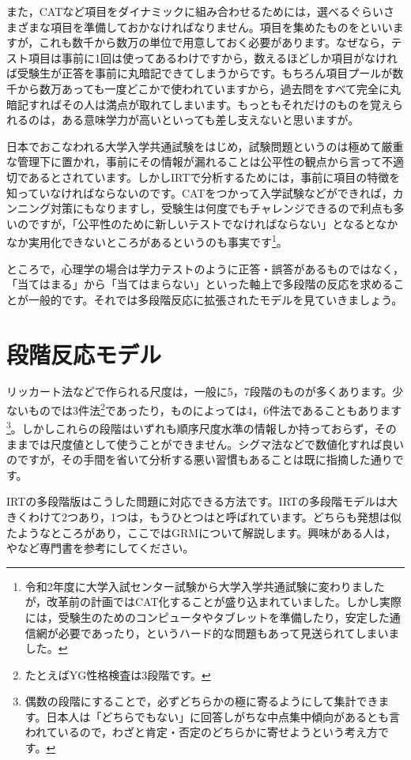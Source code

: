 \documentclass{ltjsbook}
\begin{document}
また，CATなど項目をダイナミックに組み合わせるためには，選べるぐらいさまざまな項目を準備しておかなければなりません。項目を集めたものをといいますが，これも数千から数万の単位で用意しておく必要があります。なぜなら，テスト項目は事前に1回は使ってあるわけですから，数えるほどしか項目がなければ受験生が正答を事前に丸暗記できてしまうからです。もちろん項目プールが数千から数万あっても一度どこかで使われていますから，過去問をすべて完全に丸暗記すればその人は満点が取れてしまいます。もっともそれだけのものを覚えられるのは，ある意味学力が高いといっても差し支えないと思いますが。

日本でおこなわれる大学入学共通試験をはじめ，試験問題というのは極めて厳重な管理下に置かれ，事前にその情報が漏れることは公平性の観点から言って不適切であるとされています。しかしIRTで分析するためには，事前に項目の特徴を知っていなければならないのです。CATをつかって入学試験などができれば，カンニング対策にもなりますし，受験生は何度でもチャレンジできるので利点も多いのですが，「公平性のために新しいテストでなければならない」となるとなかなか実用化できないところがあるというのも事実です\footnote{令和2年度に大学入試センター試験から大学入学共通試験に変わりましたが，改革前の計画ではCAT化することが盛り込まれていました。しかし実際には，受験生のためのコンピュータやタブレットを準備したり，安定した通信網が必要であったり，というハード的な問題もあって見送られてしまいました。}。

ところで，心理学の場合は学力テストのように正答・誤答があるものではなく，「当てはまる」から「当てはまらない」といった軸上で多段階の反応を求めることが一般的です。それでは多段階反応に拡張されたモデルを見ていきましょう。
\section{段階反応モデル}
リッカート法などで作られる尺度は，一般に5，7段階のものが多くあります。少ないものでは3件法\footnote{たとえばYG性格検査は3段階です。}であったり，ものによっては4，6件法であることもあります\footnote{偶数の段階にすることで，必ずどちらかの極に寄るようにして集計できます。日本人は「どちらでもない」に回答しがちな中点集中傾向があるとも言われているので，わざと肯定・否定のどちらかに寄せようという考え方です。}。しかしこれらの段階はいずれも順序尺度水準の情報しか持っておらず，そのままでは尺度値として使うことができません。シグマ法などで数値化すれば良いのですが，その手間を省いて分析する悪い習慣もあることは既に指摘した通りです。

IRTの多段階版はこうした問題に対応できる方法です。IRTの多段階モデルは大きくわけて2つあり，1つは\citep{samejima1997graded}，もうひとつは\citep{muraki1992generalized}と呼ばれています。どちらも発想は似たようなところがあり，ここではGRMについて解説します。興味がある人は，\citet{Toyoda20120824}や\citet{Katoken2014}など専門書を参考にしてください。
\end{document}
